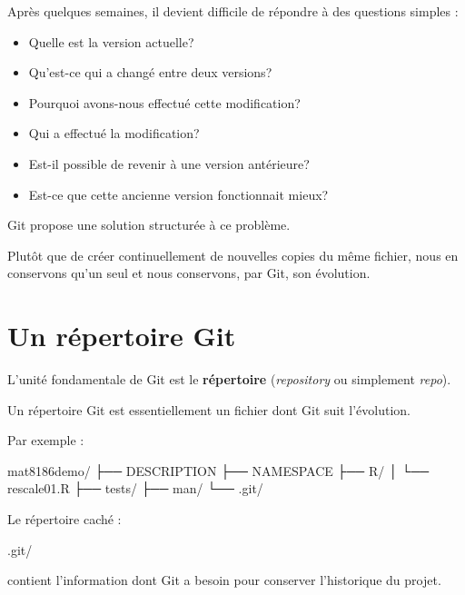 \documentclass[
  letterpaper,
  DIV=11,
  numbers=noendperiod]{scrreprt}
\newenvironment{Shaded}{\begin{snugshade}}{\end{snugshade}}
\newcommand{\NormalTok}[1]{\textcolor[rgb]{0.00,0.23,0.31}{#1}}
\providecommand{\tightlist}{%
  \setlength{\itemsep}{0pt}\setlength{\parskip}{0pt}}\usepackage{longtable,booktabs,array}
\begin{document}
Après quelques semaines, il devient difficile de répondre à des
questions simples :

\begin{itemize}
\tightlist
\item
  Quelle est la version actuelle?
\item
  Qu'est-ce qui a changé entre deux versions?
\item
  Pourquoi avons-nous effectué cette modification?
\item
  Qui a effectué la modification?
\item
  Est-il possible de revenir à une version antérieure?
\item
  Est-ce que cette ancienne version fonctionnait mieux?
\end{itemize}

Git propose une solution structurée à ce problème.

Plutôt que de créer continuellement de nouvelles copies du même fichier,
nous en conservons qu'un seul et nous conservons, par Git, son
évolution.

\section{Un répertoire Git}\label{un-ruxe9pertoire-git}

L'unité fondamentale de Git est le \textbf{répertoire}
(\emph{repository} ou simplement \emph{repo}).

Un répertoire Git est essentiellement un fichier dont Git suit
l'évolution.

Par exemple :

\begin{Shaded}
\begin{Highlighting}[]
\NormalTok{mat8186demo/}
\NormalTok{├── DESCRIPTION}
\NormalTok{├── NAMESPACE}
\NormalTok{├── R/}
\NormalTok{│   └── rescale01.R}
\NormalTok{├── tests/}
\NormalTok{├── man/}
\NormalTok{└── .git/}
\end{Highlighting}
\end{Shaded}

Le répertoire caché :

\begin{Shaded}
\begin{Highlighting}[]
\NormalTok{.git/}
\end{Highlighting}
\end{Shaded}

contient l'information dont Git a besoin pour conserver l'historique du
projet.
\end{document}
